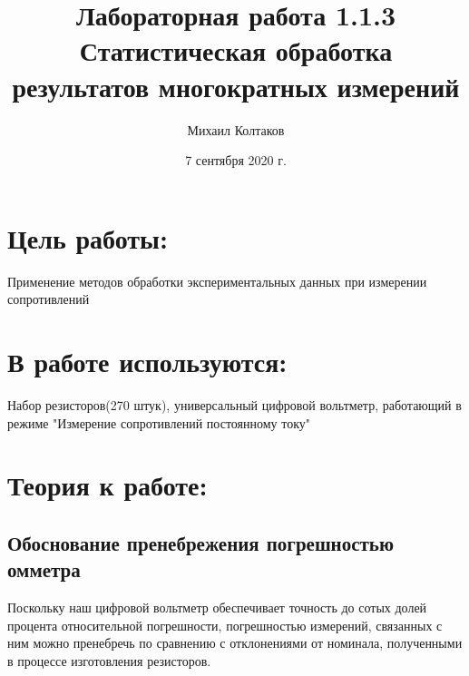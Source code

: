 \documentclass[a4paper, 12pt]{article}
\title{Лабораторная работа 1.1.3 Статистическая обработка результатов многократных измерений}
\author{Михаил Колтаков}
\date{7 сентября 2020 г.}
\begin{document}
	\maketitle
	\section*{Цель работы:}
		Применение методов обработки экспериментальных данных при измерении сопротивлений
	\section*{В работе используются:}
		Набор резисторов(270 штук), универсальный цифровой вольтметр, работающий в режиме "Измерение сопротивлений постоянному току"
	\section*{Теория к работе:}
		\subsection*{Обоснование пренебрежения погрешностью омметра}
			Поскольку наш цифровой вольтметр обеспечивает точность до сотых долей процента относительной погрешности, погрешностью измерений, связанных с ним можно пренебречь по сравнению с отклонениями от номинала, полученными в процессе изготовления резисторов.
\end{document}
